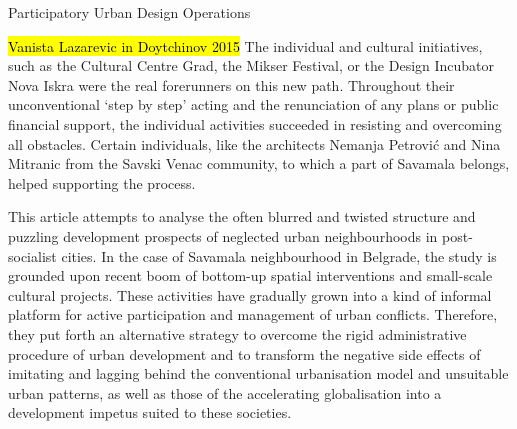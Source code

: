 \documentclass[11pt]{report}
\begin{document}
Participatory Urban Design Operations

\hl{Vanista Lazarevic in Doytchinov 2015}
	The  individual  and cultural  initiatives,  such  as  the  Cultural  Centre Grad, the Mikser Festival, or the Design Incubator Nova  Iskra  were  the  real  forerunners  on  this  new path.  Throughout  their  unconventional  ‘step  by step’  acting  and  the  renunciation  of  any  plans  or public  financial  support,  the  individual  activities succeeded in resisting and overcoming all obstacles. Certain  individuals,  like  the  architects  Nemanja Petrović  and  Nina  Mitranic  from  the  Savski  Venac community,  to  which  a  part  of  Savamala  belongs, helped supporting the process.

This article attempts to analyse the often blurred and twisted structure and puzzling development prospects of neglected urban neighbourhoods in post-socialist cities. In the case of Savamala neighbourhood in Belgrade, the study is grounded upon recent boom of bottom-up spatial interventions and small-scale cultural projects. These activities have gradually grown into a kind of informal platform for active participation and management of urban conflicts. Therefore, they put forth an alternative strategy to overcome the rigid administrative procedure of urban development and to transform the negative side effects of imitating and lagging behind the conventional urbanisation model and unsuitable urban patterns, as well as those of the accelerating globalisation into a development impetus suited to these societies.  
\end{document}
